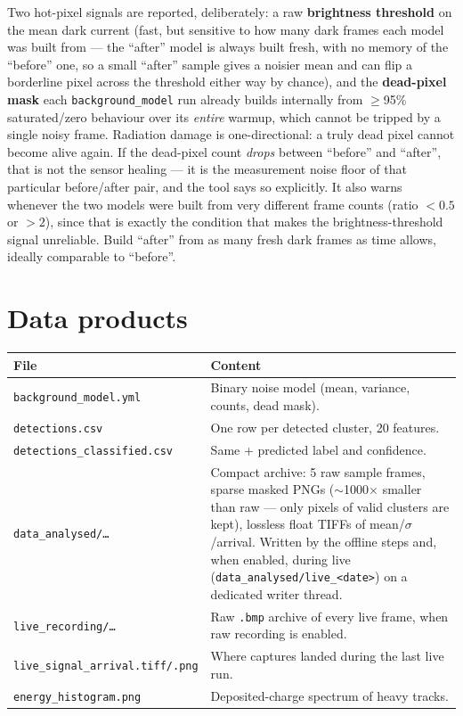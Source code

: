 \documentclass[11pt,a4paper]{article}
\begin{document}
Two hot-pixel signals are reported, deliberately: a raw \textbf{brightness
threshold} on the mean dark current (fast, but sensitive to how many dark
frames each model was built from --- the ``after'' model is always built
fresh, with no memory of the ``before'' one, so a small ``after'' sample
gives a noisier mean and can flip a borderline pixel across the threshold
either way by chance), and the \textbf{dead-pixel mask} each
\texttt{background\_model} run already builds internally from $\geq$95\%
saturated/zero behaviour over its \emph{entire} warmup, which cannot be
tripped by a single noisy frame. Radiation damage is one-directional: a
truly dead pixel cannot become alive again. If the dead-pixel count
\emph{drops} between ``before'' and ``after'', that is not the sensor
healing --- it is the measurement noise floor of that particular
before/after pair, and the tool says so explicitly. It also warns whenever
the two models were built from very different frame counts (ratio
$<0.5$ or $>2$), since that is exactly the condition that makes the
brightness-threshold signal unreliable. Build ``after'' from as many fresh
dark frames as time allows, ideally comparable to ``before''.

\section{Data products}
\begin{longtable}{p{5.2cm}p{9.5cm}}
\toprule
\textbf{File} & \textbf{Content} \\
\midrule
\texttt{background\_model.yml} & Binary noise model (mean, variance, counts, dead mask). \\
\texttt{detections.csv} & One row per detected cluster, 20 features. \\
\texttt{detections\_classified.csv} & Same + predicted label and confidence. \\
\texttt{data\_analysed/\ldots} & Compact archive: 5 raw sample frames,
sparse masked PNGs ($\sim$1000$\times$ smaller than raw --- only pixels of
valid clusters are kept), lossless float TIFFs of mean/$\sigma$/arrival.
Written by the offline steps and, when enabled, during live
(\texttt{data\_analysed/live\_<date>}) on a dedicated writer thread. \\
\texttt{live\_recording/\ldots} & Raw \texttt{.bmp} archive of every live
frame, when raw recording is enabled. \\
\texttt{live\_signal\_arrival.tiff/.png} & Where captures landed during the last live run. \\
\texttt{energy\_histogram.png} & Deposited-charge spectrum of heavy tracks. \\
\bottomrule
\end{longtable}
\end{document}
